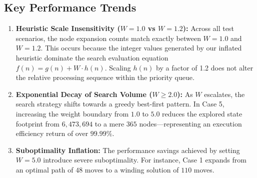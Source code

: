 \documentclass[11pt,a4paper]{article}
\begin{document}
\subsection{Key Performance Trends}
\begin{enumerate}
    \item \textbf{Heuristic Scale Insensitivity ($W=1.0$ vs $W=1.2$):} Across all test scenarios, the node expansion counts match exactly between $W=1.0$ and $W=1.2$. This occurs because the integer values generated by our inflated heuristic dominate the search evaluation equation $f(n) = g(n) + W \cdot h(n)$. Scaling $h(n)$ by a factor of 1.2 does not alter the relative processing sequence within the priority queue.
    \item \textbf{Exponential Decay of Search Volume ($W \ge 2.0$):} As $W$ escalates, the search strategy shifts towards a greedy best-first pattern. In Case 5, increasing the weight boundary from $1.0$ to $5.0$ reduces the explored state footprint from $6,473,694$ to a mere $365$ nodes—representing an execution efficiency return of over $99.99\%$.
    \item \textbf{Suboptimality Inflation:} The performance savings achieved by setting $W = 5.0$ introduce severe suboptimality. For instance, Case 1 expands from an optimal path of $48$ moves to a winding solution of $110$ moves.
\end{enumerate}
\end{document}
